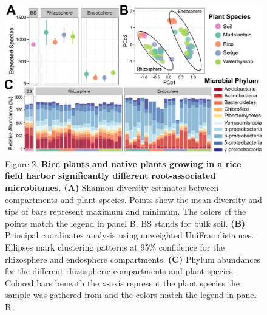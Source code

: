 \begin{figure}[h]
\centering
\includegraphics[width=6in]{Figures/figure2_2}
\caption[Figure 3.2]{Figure 2. \textbf{Rice plants and native plants growing in a rice field harbor significantly different root-associated microbiomes.} \textbf{(A)} Shannon diversity estimates between compartments and plant species. Points show the mean diversity and tips of bars represent maximum and minimum. The colors of the points match the legend in panel B. BS stands for bulk soil. \textbf{(B)} Principal coordinates analysis using unweighted UniFrac distances. Ellipses mark clustering patterns at 95\% confidence for the rhizosphere and endosphere compartments. \textbf{(C)} Phylum abundances for the different rhizospheric compartments and plant species. Colored bars beneath the x-axis represent the plant species the sample was gathered from and the colors match the legend in panel B.
}
\label{Figure 3.2}
\end{figure}

